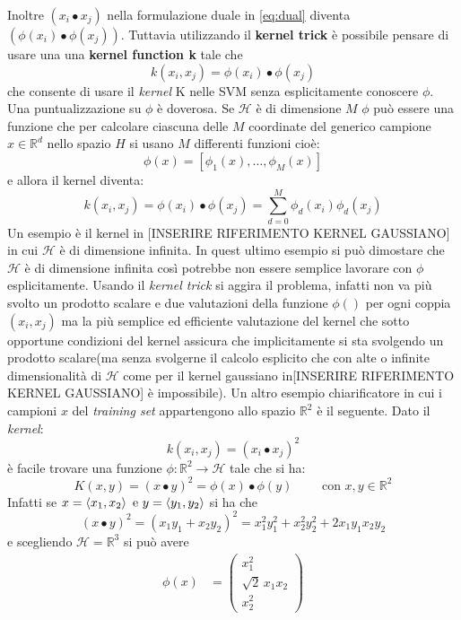 Inoltre $(x_i \bullet x_j)$ nella formulazione duale in \eqref{eq:dual} diventa $(\phi(x_i) \bullet \phi(x_j))$. Tuttavia utilizzando il \textbf{kernel trick} è possibile pensare di usare una una \textbf{kernel function k} tale che
\begin{equation}
\label{eq:kerdef}
k(x_i , x_j) = \phi(x_i) \bullet \phi(x_j)
\end{equation}
che consente di usare il \textit{kernel} K nelle \ac{SVM} senza esplicitamente conoscere $\phi$.
Una puntualizzazione su $\phi$ è doverosa. Se $\mathcal{H}$ è di dimensione $M$ $\phi$ può essere una funzione che per calcolare ciascuna delle $M$ coordinate del generico campione $x \in \mathbb{R}^{d}$ nello spazio $H$ si usano $M$ differenti funzioni cioè:
\[
\phi(x) =[\phi_1(x),\dots,\phi_M(x)]
\]
e allora il kernel diventa:
\begin{equation}
k(x_i , x_j) = \phi(x_i) \bullet \phi(x_j) = \sum_{d=0}^{M}\phi_d(x_i)\phi_d(x_j)
\end{equation}
 Un esempio è il kernel in [INSERIRE RIFERIMENTO KERNEL GAUSSIANO] in cui $\mathcal{H}$ è di dimensione infinita. In quest ultimo esempio si può dimostare che $\mathcal{H}$ è di dimensione infinita così potrebbe non essere semplice lavorare con $\phi$ esplicitamente. Usando il \textit{kernel trick} si aggira il problema, infatti non va più svolto un prodotto scalare e due valutazioni della funzione $\phi()$ per ogni coppia $(x_i , x_j)$  ma la più semplice ed efficiente valutazione del kernel che sotto opportune condizioni del kernel assicura che implicitamente si sta svolgendo un prodotto scalare(ma senza svolgerne il calcolo esplicito che con alte o infinite dimensionalità di $\mathcal{H}$ come per il kernel gaussiano in[INSERIRE RIFERIMENTO KERNEL GAUSSIANO] è impossibile). Un altro esempio chiarificatore in cui i campioni $x$ del \textit{training set} appartengono allo spazio $\mathbb{R}^2$ è il seguente. Dato il \textit{kernel}:
 \begin{equation*}
 k(x_i,x_j) = (x_i \bullet x_j)^2
 \end{equation*}
 è facile trovare una funzione $\phi : \mathbb{R}^2 \to \mathcal{H}$ tale che si ha:
\begin{equation*}
 K(x,y) = (x \bullet y)^2 = \phi(x) \bullet \phi(y) \qquad \text{ con } x,y \in \mathbb{R}^2
\end{equation*}
Infatti se $x=\braket{x_1 , x_2} \text{ e } y=\braket{y_1 , y_2}$ si ha che
\begin{equation}
\label{eq:kernelex}
(x \bullet y)^2 = (x_1y_1 + x_2y_2)^2 = x_{1}^{2}y_{1}^{2} + x_{2}^{2}y_{2}^{2} + 2x_{1}y_{1}x_{2}y_{2}
\end{equation}
e scegliendo $\mathcal{H} = \mathbb{R}^3$ si può avere
 \begin{align*}
    \phi(x) &= \begin{pmatrix}
           x_{1}^2 \\
           \sqrt{2}\,x_{1}x_{2} \\
           x_{2}^2
         \end{pmatrix}
  \end{align*}
 
